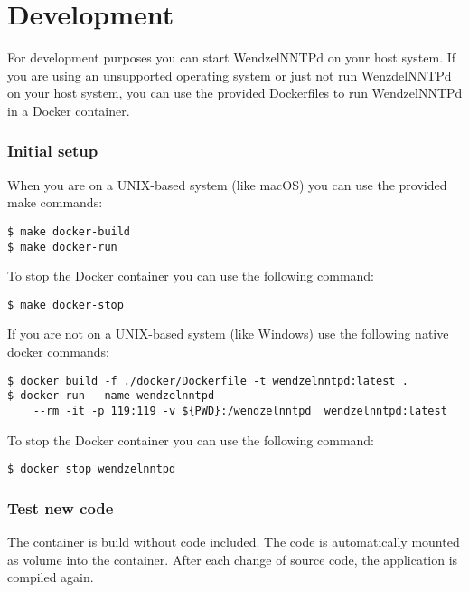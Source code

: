 \chapter{Development}

For development purposes you can start WendzelNNTPd on your host system. If you are using an unsupported operating system or just not run WenzdelNNTPd on your host system, you can use the provided Dockerfiles to run WendzelNNTPd in a Docker container.

\subsection{Initial setup}
When you are on a UNIX-based system (like macOS) you can use the provided make commands:
\begin{verbatim}
$ make docker-build
$ make docker-run
\end{verbatim}
To stop the Docker container you can use the following command:
\begin{verbatim}
$ make docker-stop
\end{verbatim}
If you are not on a UNIX-based system (like Windows) use the following native docker commands:
\begin{verbatim}
$ docker build -f ./docker/Dockerfile -t wendzelnntpd:latest .
$ docker run --name wendzelnntpd 
    --rm -it -p 119:119 -v ${PWD}:/wendzelnntpd  wendzelnntpd:latest
\end{verbatim}
To stop the Docker container you can use the following command:
\begin{verbatim}
$ docker stop wendzelnntpd
\end{verbatim}

\subsection{Test new code}
The container is build without code included. The code is automatically mounted as volume into the container. After each change of source code, the application is compiled again.
